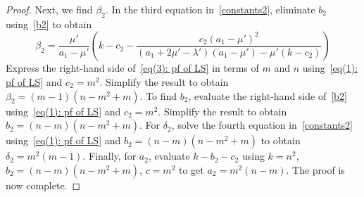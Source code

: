 \documentclass[11pt]{article}
\theoremstyle{definition}
\numberwithin{equation}{section}
\numberwithin{equation}{section}
\begin{document}
\begin{proof}
Next, we find $\beta_2$.
In the third equation in~\eqref{constants2}, eliminate $b_2$ using~\eqref{b2} to obtain
\begin{equation}\label{eq(3): pf of LS}
	\beta_2 = \frac{\mu'}{a_1-\mu'} \left( k-c_2 - \frac{c_2(a_1 -\mu')^2}{(a_1 +2\mu' -\lambda')(a_1 -\mu') -\mu'(k-c_2)}\right)
\end{equation} 
Express the right-hand side of~\eqref{eq(3): pf of LS} in terms of $m$ and $n$ using~\eqref{eq(1): pf of LS} and $c_2=m^2$.
Simplify the result to obtain $\beta_2 = (m-1)(n-m^2+m)$.
To find $b_2$, evaluate the right-hand side of~\eqref{b2} using~\eqref{eq(1): pf of LS} and $c_2=m^2$. 
Simplify the result to obtain $b_2=(n-m)(n-m^2+m)$.
For $\delta_2$, solve the fourth equation in~\eqref{constants2} using~\eqref{eq(1): pf of LS} and $b_2=(n-m)(n-m^2+m)$ to obtain $\delta_2 = m^2(m-1)$.
Finally, for $a_2$, evaluate $k-b_2-c_2$ using $k=n^2$, $b_2=(n-m)(n-m^2+m)$, $c=m^2$ to get $a_2=m^2(n-m)$. 
The proof is now complete.
\end{proof}
\end{document}
